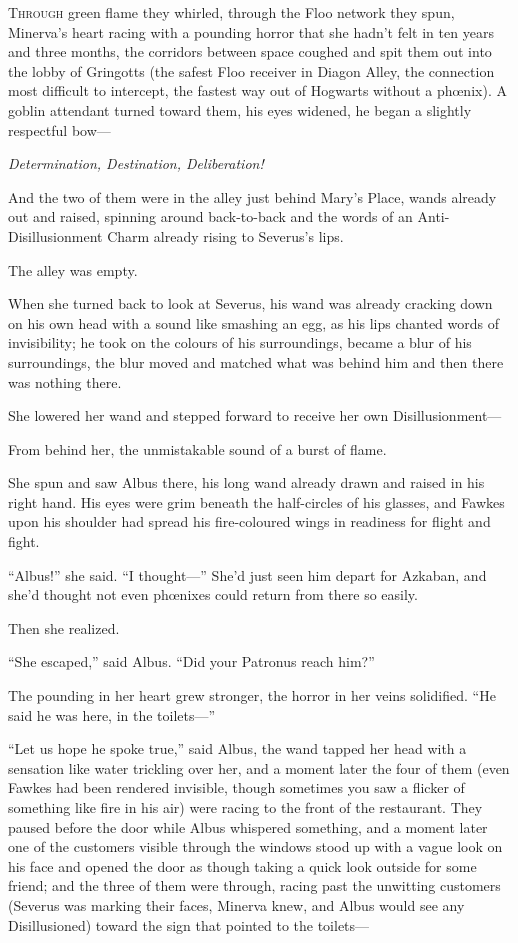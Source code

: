 
\lettrine{T}{hrough} green flame they whirled, through the Floo network they spun, Minerva’s heart racing with a pounding horror that she hadn’t felt in ten years and three months, the corridors between space coughed and spit them out into the lobby of Gringotts (the safest Floo receiver in Diagon Alley, the connection most difficult to intercept, the fastest way out of Hogwarts without a phœnix). A goblin attendant turned toward them, his eyes widened, he began a slightly respectful bow—

\emph{Determination, Destination, Deliberation!}

And the two of them were in the alley just behind Mary’s Place, wands already out and raised, spinning around back-to-back and the words of an Anti-Disillusionment Charm already rising to Severus’s lips.

The alley was empty.

When she turned back to look at Severus, his wand was already cracking down on his own head with a sound like smashing an egg, as his lips chanted words of invisibility; he took on the colours of his surroundings, became a blur of his surroundings, the blur moved and matched what was behind him and then there was nothing there.

She lowered her wand and stepped forward to receive her own Disillusionment—

From behind her, the unmistakable sound of a burst of flame.

She spun and saw Albus there, his long wand already drawn and raised in his right hand. His eyes were grim beneath the half-circles of his glasses, and Fawkes upon his shoulder had spread his fire-coloured wings in readiness for flight and fight.

“Albus!” she said.
“I thought—” She’d just seen him depart for Azkaban, and she’d thought not even phœnixes could return from there so easily.

Then she realized.

“She escaped,” said Albus.
“Did your Patronus reach him?”

The pounding in her heart grew stronger, the horror in her veins solidified.
“He said he was here, in the toilets—”

“Let us hope he spoke true,” said Albus, the wand tapped her head with a sensation like water trickling over her, and a moment later the four of them (even Fawkes had been rendered invisible, though sometimes you saw a flicker of something like fire in his air) were racing to the front of the restaurant. They paused before the door while Albus whispered something, and a moment later one of the customers visible through the windows stood up with a vague look on his face and opened the door as though taking a quick look outside for some friend; and the three of them were through, racing past the unwitting customers (Severus was marking their faces, Minerva knew, and Albus would see any Disillusioned) toward the sign that pointed to the toilets—

